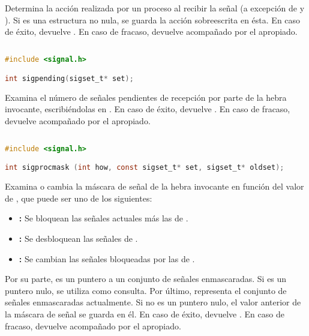 Determina la acción  realizada por un proceso al recibir la señal  (a excepción de  y ).
Si  es una estructura no nula, se guarda la acción sobreescrita en ésta.
En caso de éxito, devuelve .
En caso de fracaso, devuelve  acompañado por el  apropiado.

\subsection{}\label{sigpending}

\begin{lstlisting}[language=C]
#include <signal.h>

int sigpending(sigset_t* set);
\end{lstlisting}

Examina el número de señales pendientes de recepción por parte de la hebra invocante, escribiéndolas en .
En caso de éxito, devuelve .
En caso de fracaso, devuelve  acompañado por el  apropiado.

\subsection{}\label{sigprocmask}

\begin{lstlisting}[language=C]
#include <signal.h>

int sigprocmask (int how, const sigset_t* set, sigset_t* oldset);
\end{lstlisting}

Examina o cambia la máscara de señal de la hebra invocante en función del valor de , que puede ser uno de los siguientes:

\begin{itemize}
	\item{}\textbf{:} Se bloquean las señales actuales más las de .
	\item{}\textbf{:} Se desbloquean las señales de .
	\item{}\textbf{:} Se cambian las señales bloqueadas por las de .
\end{itemize}

Por su parte,  es un puntero a un conjunto de señales enmascaradas.
Si es un puntero nulo,  se utiliza como consulta.
Por último,  representa el conjunto de señales enmascaradas actualmente.
Si no es un puntero nulo, el valor anterior de la máscara de señal se guarda en él.
En caso de éxito, devuelve .
En caso de fracaso, devuelve  acompañado por el  apropiado.

